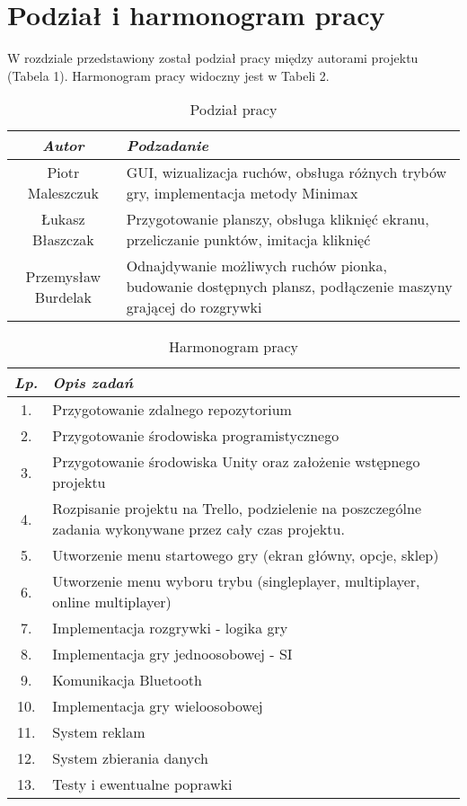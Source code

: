 \newpage\section{Podział i harmonogram pracy}
W rozdziale przedstawiony został podział pracy między autorami projektu \\(Tabela 1). Harmonogram pracy widoczny jest w Tabeli 2.

\begin{table}[!ht]
	\centering
	\begin{tabular}{|c|p{7cm}|}
		\hline \textit{Autor} & \textit{Podzadanie} \\ \hline
		Piotr Maleszczuk & GUI, wizualizacja ruchów, obsługa różnych trybów gry, implementacja metody Minimax \\ \hline
	
		Łukasz Błaszczak & Przygotowanie planszy, obsługa kliknięć ekranu, przeliczanie punktów, imitacja kliknięć \\ \hline
	
		Przemysław Burdelak & Odnajdywanie możliwych ruchów pionka, budowanie dostępnych plansz, podłączenie maszyny grającej do rozgrywki \\ \hline
	\end{tabular}
	\caption{Podział pracy}
\end{table}

\begin{table}[!ht]
	\centering
	\begin{tabular}{|c|p{7cm}|}
		\hline
		\textit{Lp.} & \textit{Opis zadań} \\ \hline
		1. & Przygotowanie zdalnego repozytorium \\ \hline
		2. & Przygotowanie środowiska programistycznego \\ \hline
		3. & Przygotowanie środowiska Unity oraz założenie wstępnego projektu \\ \hline
		4. & Rozpisanie projektu na Trello, podzielenie na poszczególne zadania wykonywane przez cały czas projektu. \\ \hline
		5. & Utworzenie menu startowego gry (ekran główny, opcje, sklep) \\ \hline
		6. & Utworzenie menu wyboru trybu (singleplayer, multiplayer, online multiplayer) \\ \hline
		7. & Implementacja rozgrywki - logika gry \\ \hline
		8. & Implementacja gry jednoosobowej - SI \\ \hline
		9. & Komunikacja Bluetooth \\ \hline
		10. & Implementacja gry wieloosobowej \\ \hline
		11. & System reklam \\ \hline
		12. & System zbierania danych \\ \hline
		13. & Testy i ewentualne poprawki \\ \hline
	\end{tabular}
	\caption{Harmonogram pracy}
\end{table}

